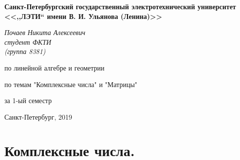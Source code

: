 \documentclass[a4paper,14pt]{article}
\begin{document}

\thispagestyle{empty}
\begin{center}
	\textbf{Санкт-Петербургский государственный электротехнический университет \\ <<,,\hspace{0.5pt}ЛЭТИ\hspace{0.5pt}`` имени В. И. Ульянова (Ленина)>>}
\end{center}
\vspace{13ex}
\begin{flushright} %
	\noindent %
	\textit{Почаев Никита Алексеевич}
	\\
	\textit{студент ФКТИ \\(группа 8381)}
\end{flushright}
\begin{center}
	\vspace{13ex}
	\vspace{1ex}
	
	по линейной алгебре и геометрии
	
	
	по темам "Комплексные числа" и "Матрицы"
	
	
	за 1-ый семестр
	
	
	\vfill %
	{\small Санкт-Петербург, 2019}
\end{center}
\newpage
\section{Комплексные числа.}
\end{document}

